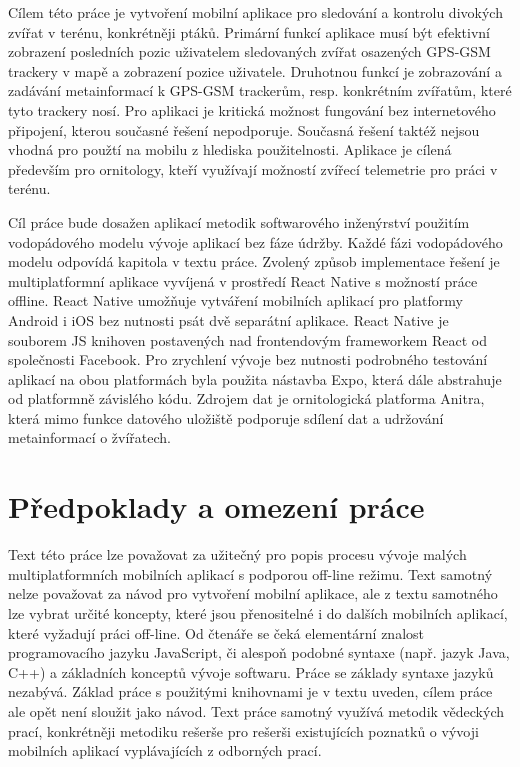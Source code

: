 Cílem této práce je vytvoření mobilní aplikace pro sledování a kontrolu divokých zvířat v terénu, konkrétněji ptáků. Primární funkcí aplikace musí být efektivní zobrazení posledních pozic uživatelem sledovaných zvířat osazených GPS-GSM trackery v mapě a zobrazení pozice uživatele. Druhotnou funkcí je zobrazování a zadávání metainformací k GPS-GSM trackerům, resp. konkrétním zvířatům, které tyto trackery nosí. Pro aplikaci je kritická možnost fungování bez internetového připojení, kterou současné řešení nepodporuje. Současná řešení taktéž nejsou vhodná pro použtí na mobilu z hlediska použitelnosti. Aplikace je cílená především pro ornitology, kteří využívají možností zvířecí telemetrie pro práci v terénu.

Cíl práce bude dosažen aplikací metodik softwarového inženýrství použitím vodopádového modelu vývoje aplikací bez fáze údržby. Každé fázi vodopádového modelu odpovídá kapitola v textu práce. Zvolený způsob implementace řešení je multiplatformní aplikace vyvíjená v prostředí React Native s možností práce offline. React Native umožňuje vytváření mobilních aplikací pro platformy Android i iOS bez nutnosti psát dvě separátní aplikace. React Native je souborem JS knihoven postavených nad frontendovým frameworkem React od společnosti Facebook. Pro zrychlení vývoje bez nutnosti podrobného testování aplikací na obou platformách byla použita nástavba Expo, která dále abstrahuje od platformně závislého kódu. Zdrojem dat je ornitologická platforma Anitra, která mimo funkce datového uložiště podporuje sdílení dat a udržování metainformací o žvířatech.

\section*{Předpoklady a omezení práce}
Text této práce lze považovat za užitečný pro popis procesu vývoje malých multiplatformních mobilních aplikací s podporou off-line režimu. Text samotný nelze považovat za návod pro vytvoření mobilní aplikace, ale z textu samotného lze vybrat určité koncepty, které jsou přenositelné i do dalších mobilních aplikací, které vyžadují práci off-line. Od čtenáře se čeká elementární znalost programovacího jazyku JavaScript, či alespoň podobné syntaxe (např. jazyk Java, C++) a základních konceptů vývoje softwaru. Práce se základy syntaxe jazyků nezabývá. Základ práce s použitými knihovnami je v textu uveden, cílem práce ale opět není sloužit jako návod.  Text práce samotný využívá metodik vědeckých prací, konkrétněji metodiku rešerše pro rešerši existujících poznatků o vývoji mobilních aplikací vyplávajících z odborných prací. 

